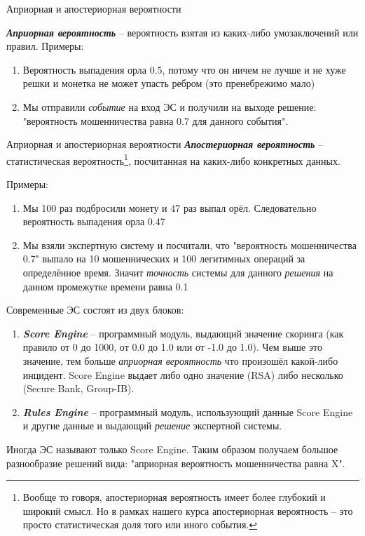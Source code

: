 \documentclass{beamer}
\newcommand{\termdef}[1]{\textbf{\textit{#1}}}
\newcommand{\term}{\textit}
\begin{document}
  \begin{frame}{Априорная и апостериорная вероятности}
  
  \termdef{Априорная вероятность} -- вероятность взятая из каких-либо умозаключений или правил.
  Примеры:
  \begin{enumerate}
  	\item Вероятность выпадения орла 0.5, потому что он ничем не лучше и не хуже решки и монетка не может упасть ребром (это пренебрежимо мало)
  	\item Мы отправили \term{событие} на вход ЭС и получили на выходе решение: "вероятность мошенничества равна 0.7 для данного события".
  \end{enumerate}
   
  \end{frame}

  \begin{frame}{Априорная и апостериорная вероятности}
\termdef{Апостериорная вероятность} -- статистическая вероятность\footnote{
	Вообще то говоря, апостериорная вероятность имеет более глубокий и широкий смысл.
	Но в рамках нашего курса апостериорная вероятность -- это просто статистическая доля того или иного события.}, посчитанная на каких-либо конкретных данных.

	Примеры: \small
	\begin{enumerate}
		\item Мы 100 раз подбросили монету и 47 раз выпал орёл. Следовательно 
		вероятность выпадения орла 0.47
		\item Мы взяли экспертную систему и посчитали, что "вероятность мошенничества 0.7"
		выпало на 10 мошеннических и 100 легитимных операций за определённое время. 
		Значит \term{точность} системы для данного \term{решения} на данном промежутке времени равна 0.1
	\end{enumerate}
\end{frame}
  
  \begin{frame}
  Современные ЭС состоят из двух блоков:
  \begin{enumerate}
  	\item \termdef{Score Engine} -- программный модуль, выдающий значение скоринга (как правило от 0 до 1000, от 0.0 до 1.0 или от -1.0 до 1.0). Чем выше это значение, тем больше
  	\textit{априорная вероятность} что произошёл какой-либо инцидент.
  	Score Engine выдает либо одно значение (RSA) 
  	либо несколько (Secure Bank, Group-IB).
  	\item \termdef{Rules Engine} -- программный модуль, использующий данные Score Engine и другие данные 
  	и выдающий \term{решение} экспертной системы.
  \end{enumerate}

  Иногда ЭС называют только Score Engine. Таким образом получаем большое разнообразие решений вида: "априорная вероятность мошенничества равна X".
  
  
  \end{frame}
  
\end{document}
